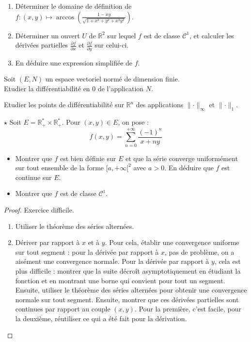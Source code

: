 \documentclass[french,a4paper]{article}
\newcommand{\R}{\mathbb{R}}
\newcommand{\st}{^*}
\theoremstyle{plain}
\theoremstyle{definition}
\theoremstyle{remark}
\begin{document}
\begin{ex}[Moulin.CD.03]{}
	\begin{enumerate}
		\item Déterminer le domaine de définition de $f:(x,y)\mapsto\displaystyle\arccos\left(\frac{1-xy}{\sqrt{1+x^2+y^2+x^2y^2}}\right)$.
		\item Déterminer un ouvert $U$ de $\R^2$ sur lequel $f$ est de classe $\mathcal{C}^1$, et calculer les dérivées partielles $\displaystyle\frac{\partial f}{\partial x}$ et $\displaystyle\frac{\partial f}{\partial y}$ sur celui-ci.
		\item En déduire une expression simplifiée de $f$.
	\end{enumerate}
\end{ex}

\begin{ex}[Moulin.CD.04]{}
	Soit $(E,N)$ un espace vectoriel normé de dimension finie. \\
	Etudier la différentiabilité en $0$ de l'application $N$.
\end{ex}

\begin{ex}[Moulin.CD.05]{}
	Etudier les points de différentiabilité sur $\R^n$ des applications $\lVert\cdot\rVert_\infty$ et $\lVert\cdot\rVert_1$.
\end{ex}

\begin{ex}[Moulin.CD.06]{$\star$}
	Soit $E=\R_+\st\times\R_+\st$. Pour $(x,y)\in E$, on pose : $$f(x,y)=\sum_{n=0}^{+\infty}\frac{(-1)^n}{x+ny}$$
	\begin{itemize}
		\item Montrer que $f$ est bien définie sur $E$ et que la série converge uniformément sur tout ensemble de la forme $[a,+\infty[^2$ avec $a>0$. En déduire que $f$ est continue sur $E$.
		\item Montrer que $f$ est de classe $\mathcal{C}^1$.
	\end{itemize}
\end{ex}
\begin{proof}
	Exercice difficile.
	\begin{enumerate}
		\item Utiliser le théorème des séries alternées.
		\item Dériver par rapport à $x$ et à $y$. Pour cela, établir une convergence uniforme sur tout segment : pour la dérivée par rapport à $x$, pas de problème, on a aisément une convergence normale. Pour la dérivée par rapport à $y$, cela est plus difficile : montrer que la suite décroît asymptotiquement en étudiant la fonction et en montrant une borne qui convient pour tout un segment. Ensuite, utiliser le théorème des séries alternées pour obtenir une convergence normale sur tout segment. Ensuite, montrer que ces dérivées partielles sont continues par rapport au couple $(x,y)$. Pour la première, c'est facile, pour la deuxième, réutiliser ce qui a été fait pour la dérivation.
	\end{enumerate}
\end{proof}
\end{document}
